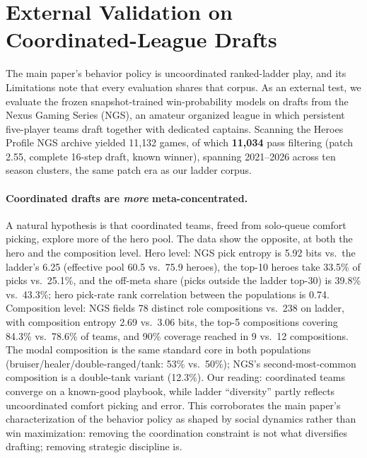 \documentclass[journal]{IEEEtran}
\begin{document}
\section{External Validation on Coordinated-League Drafts}
\label{sec:ngs}

The main paper's behavior policy is uncoordinated ranked-ladder play, and its Limitations note that every evaluation shares that corpus. As an external test, we evaluate the frozen snapshot-trained win-probability models on drafts from the Nexus Gaming Series (NGS), an amateur organized league in which persistent five-player teams draft together with dedicated captains. Scanning the Heroes Profile NGS archive yielded 11{,}132 games, of which \textbf{11{,}034} pass filtering (patch 2.55, complete 16-step draft, known winner), spanning 2021--2026 across ten season clusters, the same patch era as our ladder corpus.

\paragraph{Coordinated drafts are \textit{more} meta-concentrated.} A natural hypothesis is that coordinated teams, freed from solo-queue comfort picking, explore more of the hero pool. The data show the opposite, at both the hero and the composition level. Hero level: NGS pick entropy is 5.92 bits vs.\ the ladder's 6.25 (effective pool 60.5 vs.\ 75.9 heroes), the top-10 heroes take 33.5\% of picks vs.\ 25.1\%, and the off-meta share (picks outside the ladder top-30) is 39.8\% vs.\ 43.3\%; hero pick-rate rank correlation between the populations is 0.74. Composition level: NGS fields 78 distinct role compositions vs.\ 238 on ladder, with composition entropy 2.69 vs.\ 3.06 bits, the top-5 compositions covering 84.3\% vs.\ 78.6\% of teams, and 90\% coverage reached in 9 vs.\ 12 compositions. The modal composition is the same standard core in both populations (bruiser/healer/double-ranged/tank: 53\% vs.\ 50\%); NGS's second-most-common composition is a double-tank variant (12.3\%). Our reading: coordinated teams converge on a known-good playbook, while ladder ``diversity'' partly reflects uncoordinated comfort picking and error. This corroborates the main paper's characterization of the behavior policy as shaped by social dynamics rather than win maximization: removing the coordination constraint is not what diversifies drafting; removing strategic discipline is.
\end{document}
